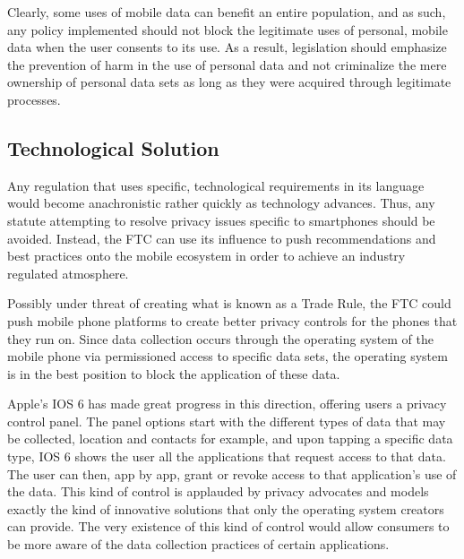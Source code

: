 Clearly, some uses of mobile data can benefit an entire population, and as such, any policy implemented should not block the legitimate uses of personal, mobile data when the user consents to its use. 
As a result, legislation should emphasize the prevention of harm in the use of personal data and not criminalize the mere ownership of personal data sets as long as they were acquired through legitimate processes. 


 	\subsection{Technological Solution}


Any regulation that uses specific, technological requirements in its language would become anachronistic rather quickly as technology advances. Thus, any statute attempting to resolve privacy issues specific to smartphones should be avoided. Instead, the FTC can use its influence to push recommendations and best practices onto the mobile ecosystem in order to achieve an industry regulated atmosphere. 

Possibly under threat of creating what is known as a Trade Rule, the FTC could push mobile phone platforms to create better privacy controls for the phones that they run on. 
Since data collection occurs through the operating system of the mobile phone via permissioned access to specific data sets, the operating system is in the best position to block the application of these data. 

Apple's IOS 6 has made great progress in this direction, offering users a privacy control panel. The panel options start with the different types of data that may be collected, location and contacts for example, and upon tapping a specific data type, IOS 6 shows the user all the applications that request access to that data. The user can then, app by app, grant or revoke access to that application's use of the data.
This kind of control is applauded by privacy advocates and models exactly the kind of innovative solutions that only the operating system creators can provide. 
The very existence of this kind of control would allow consumers to be more aware of the data collection practices of certain applications. 


